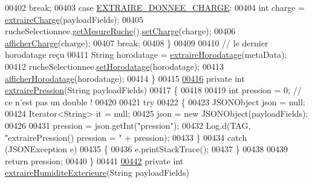 \begin{DoxyCode}
{{{00402                 \textcolor{keywordflow}{break};
00403             \textcolor{keywordflow}{case} \hyperlink{classcom_1_1example_1_1bee__honeyt_1_1_i_h_m_mobile_a5cc87519c4cba4d1f16dd98e300487a2}{EXTRAIRE\_DONNEE\_CHARGE}:
00404                 \textcolor{keywordtype}{int} charge = \hyperlink{classcom_1_1example_1_1bee__honeyt_1_1_i_h_m_mobile_a1c9c8df9039fc494293b40011ddf6f5e}{extraireCharge}(payloadFields);
00405                 rucheSelectionnee.\hyperlink{classcom_1_1example_1_1bee__honeyt_1_1_ruche_afab94785f8af31f6ce436394ab41c9f3}{getMesureRuche}().\hyperlink{classcom_1_1example_1_1bee__honeyt_1_1_mesure_ruche_aaa185bf82c41c889d3e60804da25bd30}{setCharge}(charge);
00406                 \hyperlink{classcom_1_1example_1_1bee__honeyt_1_1_i_h_m_mobile_a64c55ee927d9cb31265989d0296edc53}{afficherCharge}(charge);
00407                 \textcolor{keywordflow}{break};
00408         \}
00409 
00410         \textcolor{comment}{// le dernier horodatage reçu}
00411         String horodatage = \hyperlink{classcom_1_1example_1_1bee__honeyt_1_1_i_h_m_mobile_ae14deb90573474bc46817312624ebd20}{extraireHorodatage}(metaData);
00412         rucheSelectionnee.\hyperlink{classcom_1_1example_1_1bee__honeyt_1_1_ruche_aff1e1caa39a1d012b1714df3902941f8}{setHorodatage}(horodatage);
00413         \hyperlink{classcom_1_1example_1_1bee__honeyt_1_1_i_h_m_mobile_ae1a488c4774eea0b794257f576ab932d}{afficherHorodatage}(horodatage);
00414     \}
00415 
\hyperlink{classcom_1_1example_1_1bee__honeyt_1_1_i_h_m_mobile_ad49ff3588da89162f21ca8e983a0fb4c}{00416}     \textcolor{keyword}{private} \textcolor{keywordtype}{int} \hyperlink{classcom_1_1example_1_1bee__honeyt_1_1_i_h_m_mobile_ad49ff3588da89162f21ca8e983a0fb4c}{extrairePression}(String payloadFields)
00417     \{
00418 
00419         \textcolor{keywordtype}{int} pression = 0; \textcolor{comment}{// ce n'est pas un double !}
00420 
00421         \textcolor{keywordflow}{try}
00422         \{
00423             JSONObject json = null;
00424             Iterator<String> it = null;
00425             json = \textcolor{keyword}{new} JSONObject(payloadFields);
00426 
00431             pression = json.getInt(\textcolor{stringliteral}{"pression"});
00432             Log.d(TAG, \textcolor{stringliteral}{"extrairePression() pression = "} + pression);
00433         \}
00434         \textcolor{keywordflow}{catch} (JSONException e)
00435         \{
00436             e.printStackTrace();
00437         \}
00438 
00439         \textcolor{keywordflow}{return} pression;
00440     \}
00441 
\hyperlink{classcom_1_1example_1_1bee__honeyt_1_1_i_h_m_mobile_a9a8131f2198266585e602e6fe9d29ef0}{00442}     \textcolor{keyword}{private} \textcolor{keywordtype}{int} \hyperlink{classcom_1_1example_1_1bee__honeyt_1_1_i_h_m_mobile_a9a8131f2198266585e602e6fe9d29ef0}{extraireHumiditeExterieure}(String payloadFields)
}}}
\end{DoxyCode}
